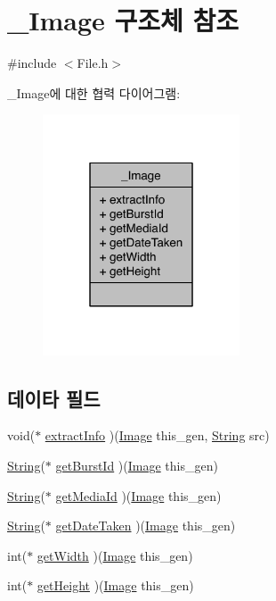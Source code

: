 \hypertarget{struct___image}{\section{\-\_\-\-Image 구조체 참조}
\label{struct___image}
}


{\ttfamily \#include $<$File.\-h$>$}



\-\_\-\-Image에 대한 협력 다이어그램\-:\nopagebreak
\begin{figure}[H]
\begin{center}
\leavevmode
\includegraphics[width=166pt]{dc/ddb/struct___image__coll__graph}
\end{center}
\end{figure}
\subsection*{데이타 필드}
\begin{DoxyCompactItemize}
\item 
void($\ast$ \hyperlink{struct___image_ab6c9b3a1c46d72f02fd0197b3d154b75}{extract\-Info} )(\hyperlink{_file_8h_aeb62f8214ffbffd373f144739b9eca60}{Image} this\-\_\-gen, \hyperlink{dit_8h_a2efe6d463d80744789f228f5dc4baa39}{String} src)
\item 
\hyperlink{dit_8h_a2efe6d463d80744789f228f5dc4baa39}{String}($\ast$ \hyperlink{struct___image_a43ccbbf065326a2647887464f16b7373}{get\-Burst\-Id} )(\hyperlink{_file_8h_aeb62f8214ffbffd373f144739b9eca60}{Image} this\-\_\-gen)
\item 
\hyperlink{dit_8h_a2efe6d463d80744789f228f5dc4baa39}{String}($\ast$ \hyperlink{struct___image_a3ebc4a1fcad891955f6bd315dbf79b87}{get\-Media\-Id} )(\hyperlink{_file_8h_aeb62f8214ffbffd373f144739b9eca60}{Image} this\-\_\-gen)
\item 
\hyperlink{dit_8h_a2efe6d463d80744789f228f5dc4baa39}{String}($\ast$ \hyperlink{struct___image_a170cc9a88ad9e65b2d8725d1370bc946}{get\-Date\-Taken} )(\hyperlink{_file_8h_aeb62f8214ffbffd373f144739b9eca60}{Image} this\-\_\-gen)
\item 
int($\ast$ \hyperlink{struct___image_ac1af259a21d8c67dab2729dc2ca8e6ab}{get\-Width} )(\hyperlink{_file_8h_aeb62f8214ffbffd373f144739b9eca60}{Image} this\-\_\-gen)
\item 
int($\ast$ \hyperlink{struct___image_a8958794ba1906035ca256305dc103399}{get\-Height} )(\hyperlink{_file_8h_aeb62f8214ffbffd373f144739b9eca60}{Image} this\-\_\-gen)
\end{DoxyCompactItemize}



